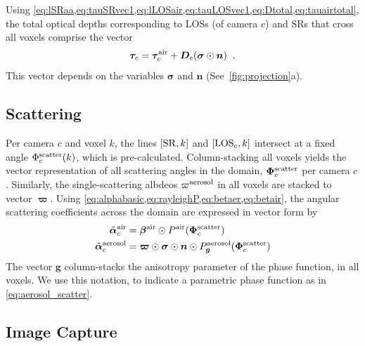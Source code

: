 \documentclass[10pt,letterpaper]{article}
\newcommand{\vect}[1]{\bm{#1}}
\begin{document}
Using
\cref{eq:lSRaa,eq:tauSRvec1,eq:lLOSair,eq:tauLOSvec1,eq:Dtotal,eq:tauairtotal},
the total optical depths corresponding to LOSs (of camera $c$) and SRs
that cross all voxels comprise the vector
\begin{equation}
  \vect{\tau}_c= \vect{\tau}_c^{\rm air}
  + {\bm D}_c (\vect{\sigma} \odot {\bm n})
  \;\;.
  \label{eq:tautotal}
\end{equation}
This vector depends on the variables $\vect{\sigma}$ and ${\bm n}$
(See~\cref{fig:projection}a).


\subsection{Scattering}
\label{sec:scattering}

Per camera $c$ and voxel $k$, the lines $[{\rm SR},k]$ and $[{\rm
  LOS}_c,k]$ intersect at a fixed angle $\Phi^{\rm scatter}_c(k)$,
which is pre-calculated.  Column-stacking all voxels yields the vector
representation of all scattering angles in the domain,
$\vect{\Phi}^{\rm scatter}_c$ per camera $c$. Similarly, the
single-scattering albdeos $\varpi^{\rm aerosol}$ in all voxels are
stacked to vector $\vect{\varpi}$.  Using
\cref{eq:alphabasic,eq:rayleighP,eq:betaer,eq:betair}, the angular
scattering coefficients across the domain are expressed in vector form
by
\begin{align}
  \tilde{\vect{\alpha}}^{\rm air}_c &=
  \vect{\beta}^{\rm air} \odot P^{\rm air}(\vect{\Phi}^{\rm scatter}_c) \nonumber \\
  \tilde{\vect{\alpha}}^{\rm aerosol}_c &= \vect{\varpi}\odot
  \vect{\sigma} \odot {\bm n} \odot P^{\rm aerosol}_{\bm
    g}(\vect{\Phi}^{\rm scatter}_c)
  \label{eq:alpha_matrix}
\end{align}
The vector ${\bm g}$ column-stacks the anisotropy parameter of the
phase function, in all voxels. We use this notation, to indicate a
parametric phase function as in \cref{eq:aerosol_scatter}.



\subsection{Image Capture}
\label{sec:captured-image}
\end{document}

